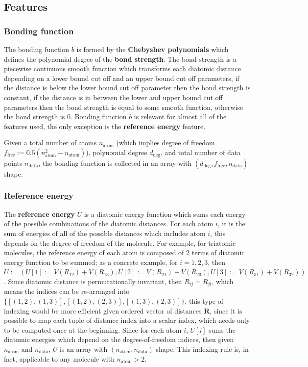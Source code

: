 \documentclass[12pt]{article}
\begin{document}
\subsection{Features}
\subsubsection{Bonding function}
\label{subsub:bondingfunction}
The bonding function $b$ is formed by the \textbf{Chebyshev polynomials} which defines the polynomial degree of the \textbf{bond strength}. The bond strength is a piecewise continuous smooth function which transforms each diatomic distance depending on a lower bound cut off and an upper bound cut off parameters, if the distance is below the lower bound cut off parameter then the bond strength is constant, if the distance is in between the lower and upper bound cut off parameters then the bond strength is equal to some smooth function, otherwise the bond strength is $0$. Bonding function $b$ is relevant for almost all of the features used, the only exception is the \textbf{reference energy} feature.

Given a total number of atoms $n_{\text{atom}}$ (which implies degree of freedom $f_{\text{free}} := 0.5(n_{\text{atom}}^2 - n_{\text{atom}})$), polynomial degree $d_{\text{deg}}$, and total number of data points $n_{\text{data}}$, the bonding function is collected in an array with $(d_{\text{deg}}, f_{\text{free}}, n_{\text{data}})$ shape.

\subsubsection{Reference energy}
\label{subsub:referencenergy}
The \textbf{reference energy} $U$ is a diatomic energy function which sums each energy of the possible combinations of the diatomic distances. For each atom $i$, it is the sum of energies of all of the possible distances which includes atom $i$, this depends on the degree of freedom of the molecule. For example, for triatomic molecules, the reference energy of each atom is composed of 2 terms of diatomic energy function to be summed; as a concrete example, for $i=1,2,3$, then $U := ( U[1] := V(R_{12}) + V(R_{13}), U[2] := V(R_{21}) + V(R_{23}), U[3] := V(R_{31}) + V(R_{32}) )$. Since diatomic distance is permutationally invariant, then $R_{ij} = R_{ji}$, which means the indices can be re-arranged into $\{[(1,2), (1,3)], 
[(1,2), (2,3)],
[(1,3), (2,3)]\}$, this type of indexing would be more efficient given ordered vector of distances $\mathbf{R}$, since it is possible to map each tuple of distance index into a scalar index, which needs only to be computed once at the beginning. Since for each atom $i$, $U[i]$ sums the diatomic energies which depend on the degree-of-freedom indices, then given $n_{\text{atom}}$ and $n_{\text{data}}$, $U$ is an array with $(n_{\text{atom}}, n_{\text{data}})$ shape. This indexing rule is, in fact, applicable to any molecule with $n_{\text{atom}} > 2$. 
\end{document}
